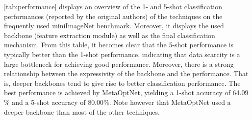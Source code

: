 \autoref{tab:performance} displays an overview of the 1- and 5-shot classification performances (reported by the original authors) of the techniques on the frequently used miniImageNet benchmark. 
Moreover, it displays the used backbone (feature extraction module) as well as the final classification mechanism. 
From this table, it becomes clear that the 5-shot performance is typically better than the 1-shot performance, indicating that data scarcity is a large bottleneck for achieving good performance. 
Moreover, there is a strong relationship between the expressivity of the backbone and the performance. 
That is, deeper backbones tend to give rise to better classification performance.
The best performance is achieved by MetaOptNet, yielding a 1-shot accuracy of $64.09$\% and a 5-shot accuracy of $80.00$\%.
Note however that MetaOptNet used a deeper backbone than most of the other techniques.
